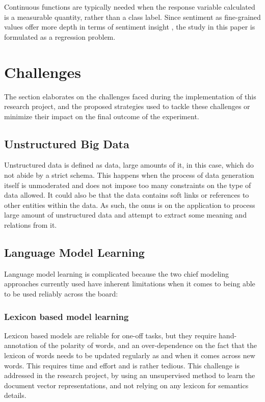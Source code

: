 \documentclass[conference]{IEEEtran}
\begin{document}
        Continuous functions are typically needed when the response variable calculated is a measurable quantity, rather than a class label. Since sentiment as fine-grained values offer more depth in terms of sentiment insight \cite{drake2008sentiment}, the study in this paper is formulated as a regression problem.

\vspace{5mm}

\section{Challenges}
    The section elaborates on the challenges faced during the implementation of this research project, and the proposed strategies used to tackle these challenges or minimize their impact on the final outcome of the experiment.

    \subsection{Unstructured Big Data}
        Unstructured data is defined as data, large amounts of it, in this case, which do not abide by a strict schema\cite{buneman1996query}. This happens when the process of data generation itself is unmoderated and does not impose too many constraints on the type of data allowed. It could also be that the data contains soft links or references to other entities within the data. As such, the onus is on the application to process large amount of unstructured data and attempt to extract some meaning and relations from it.

    \subsection{Language Model Learning}
        Language model learning is complicated because the two chief modeling approaches currently used have inherent limitations when it comes to being able to be used reliably across the board:
        
        \subsubsection{Lexicon based model learning}
        Lexicon based models are reliable for one-off tasks, but they require hand-annotation of the polarity of words, and an over-dependence on the fact that the lexicon of words needs to be updated regularly as and when it comes across new words. This requires time and effort and is rather tedious. This challenge is addressed in the research project, by using an unsupervised method to learn the document vector representations, and not relying on any lexicon for semantics details.
\end{document}
